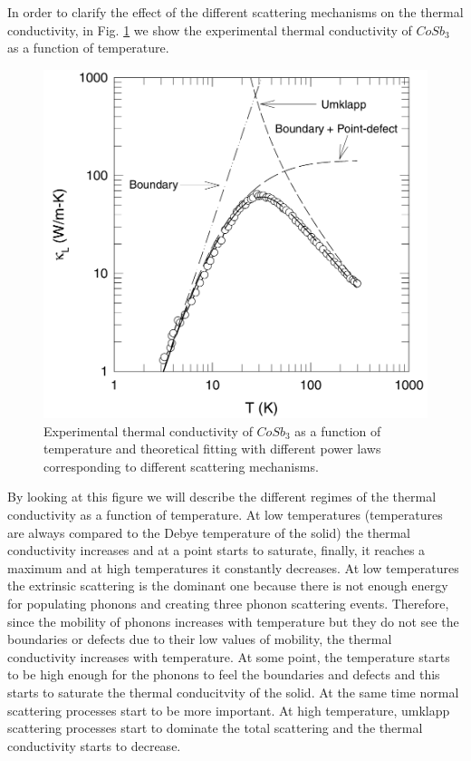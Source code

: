 In order to clarify the effect of the different scattering mechanisms on the thermal conductivity, in Fig. \ref{prototypical} we show the experimental thermal conductivity of $CoSb_{3}$\cite{yang2002influence} as a 
function of temperature.
\begin{figure}[h]
\begin{center}
\includegraphics[width=0.7\linewidth]{Figures/prototypical-solid.png}
\caption[Thermal conductivity of $CoSb_{3}$]{Experimental thermal conductivity of $CoSb_{3}$\cite{yang2002influence} as a function of temperature and theoretical fitting with different power laws corresponding to different 
scattering mechanisms.}
\label{prototypical}
\end{center}
\end{figure}
By looking at this figure we will describe the different regimes of the thermal conductivity as a function of temperature. At low temperatures (temperatures are always 
compared to the Debye temperature of the solid) the thermal conductivity increases and at a point starts to saturate, finally, it reaches a maximum and at high temperatures it constantly decreases. At low 
temperatures the extrinsic scattering is the dominant one because there is not enough energy for populating phonons and creating three phonon scattering events. Therefore, since the mobility of phonons increases 
with temperature but they do not see the boundaries or defects due to their low values of mobility, the thermal conductivity increases with temperature. At some point, the temperature starts to be high enough for the 
phonons to feel the boundaries and defects and this starts to saturate the thermal conducitvity of the solid. At the same time normal scattering processes start to be more important. At high temperature, umklapp 
scattering processes start to dominate the total scattering and the thermal conductivity starts to decrease. \\

